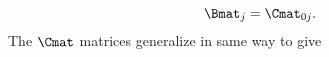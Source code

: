 \begin{equation}
\Bmat_{j} = \Cmat_{0 j}.
\end{equation}
The $\Cmat$ matrices generalize in same way to give